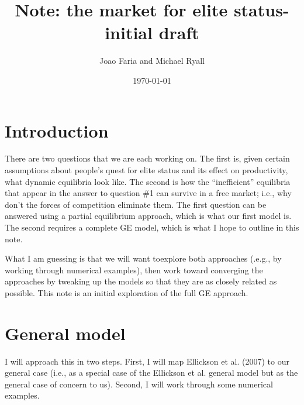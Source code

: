 \documentclass[12pt,letterpaper]{article}
\title{Note: the market for elite status-initial draft}
\author{Joao Faria and Michael Ryall}
\date{\today}
\begin{document}
	
	\maketitle

	
	
	\onehalfspacing
	
	\section{Introduction}
	There are two questions that we are each working on. 
	The first is, given certain assumptions about people's quest for elite status and its effect on productivity, what dynamic equilibria look like.
	The second is how the ``inefficient'' equilibria that appear in the answer to question \#1 can survive in a free market; i.e., why don't the forces of competition eliminate them.
	The first question can be answered using a partial equilibrium approach, which is what our first model is.
	The second requires a complete GE model, which is what I hope to outline in this note.
	
	What I am guessing is that we will want toexplore both approaches (.e.g., by working through numerical examples), then work toward converging the approaches by tweaking up the models so that they are as closely related as possible. 
	This note is an initial exploration of the full GE approach.
%	


	
	\section{General model}
	I will approach this in two steps. 
	First, I will map Ellickson et al. (2007) to our  general case (i.e., as a special case of the Ellickson et al. general model but as the general case of concern to us).
	Second, I will work through some numerical examples.
	
\end{document}
